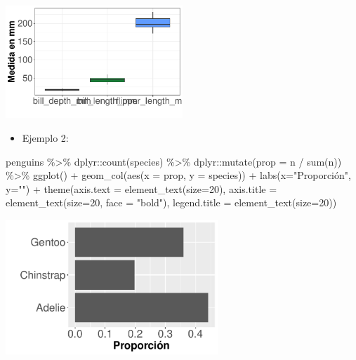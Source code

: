 \documentclass[
  letterpaper,
  DIV=11,
  numbers=noendperiod]{scrreprt}
\newenvironment{Shaded}{\begin{snugshade}}{\end{snugshade}}
\newcommand{\AttributeTok}[1]{\textcolor[rgb]{0.40,0.45,0.13}{#1}}
\newcommand{\DecValTok}[1]{\textcolor[rgb]{0.68,0.00,0.00}{#1}}
\newcommand{\FunctionTok}[1]{\textcolor[rgb]{0.28,0.35,0.67}{#1}}
\newcommand{\NormalTok}[1]{\textcolor[rgb]{0.00,0.23,0.31}{#1}}
\newcommand{\SpecialCharTok}[1]{\textcolor[rgb]{0.37,0.37,0.37}{#1}}
\newcommand{\StringTok}[1]{\textcolor[rgb]{0.13,0.47,0.30}{#1}}
\providecommand{\tightlist}{%
  \setlength{\itemsep}{0pt}\setlength{\parskip}{0pt}}\usepackage{longtable,booktabs,array}
\begin{document}
\begin{center}
\includegraphics[width=0.5\textwidth,height=0.5\textheight]{t1_intro_files/figure-pdf/unnamed-chunk-104-1.pdf}
\end{center}

\begin{itemize}
\tightlist
\item
  Ejemplo 2:
\end{itemize}

\begin{Shaded}
\begin{Highlighting}[]
\NormalTok{penguins }\SpecialCharTok{\%\textgreater{}\%}
\NormalTok{  dplyr}\SpecialCharTok{::}\FunctionTok{count}\NormalTok{(species) }\SpecialCharTok{\%\textgreater{}\%}
\NormalTok{  dplyr}\SpecialCharTok{::}\FunctionTok{mutate}\NormalTok{(}\AttributeTok{prop =}\NormalTok{ n }\SpecialCharTok{/} \FunctionTok{sum}\NormalTok{(n)) }\SpecialCharTok{\%\textgreater{}\%}
  \FunctionTok{ggplot}\NormalTok{() }\SpecialCharTok{+} \FunctionTok{geom\_col}\NormalTok{(}\FunctionTok{aes}\NormalTok{(}\AttributeTok{x =}\NormalTok{ prop, }\AttributeTok{y =}\NormalTok{ species)) }\SpecialCharTok{+}
  \FunctionTok{labs}\NormalTok{(}\AttributeTok{x=}\StringTok{"Proporción"}\NormalTok{, }\AttributeTok{y=}\StringTok{""}\NormalTok{) }\SpecialCharTok{+} 
  \FunctionTok{theme}\NormalTok{(}\AttributeTok{axis.text =} \FunctionTok{element\_text}\NormalTok{(}\AttributeTok{size=}\DecValTok{20}\NormalTok{),}
\AttributeTok{axis.title =} \FunctionTok{element\_text}\NormalTok{(}\AttributeTok{size=}\DecValTok{20}\NormalTok{, }\AttributeTok{face =} \StringTok{"bold"}\NormalTok{),}
\AttributeTok{legend.title =} \FunctionTok{element\_text}\NormalTok{(}\AttributeTok{size=}\DecValTok{20}\NormalTok{)) }
\end{Highlighting}
\end{Shaded}

\begin{center}
\includegraphics[width=0.6\textwidth,height=0.4\textheight]{t1_intro_files/figure-pdf/unnamed-chunk-105-1.pdf}
\end{center}
\end{document}
